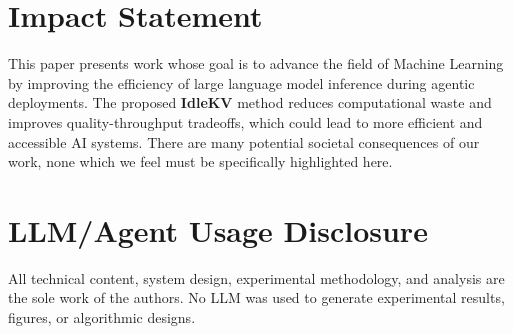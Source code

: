 \documentclass[10pt,twocolumn,letterpaper]{article}
\begin{document}
\section*{Impact Statement}

This paper presents work whose goal is to advance the field of Machine
Learning by improving the efficiency of large language model inference during
agentic deployments.
The proposed \textbf{IdleKV} method reduces computational waste and improves
quality-throughput tradeoffs, which could lead to more efficient and accessible
AI systems.
There are many potential societal consequences of our work, none which we feel
must be specifically highlighted here.

\section*{LLM/Agent Usage Disclosure}

All technical content, system design, experimental methodology, and analysis
are the sole work of the authors.
No LLM was used to generate experimental results, figures, or algorithmic
designs.



\end{document}
